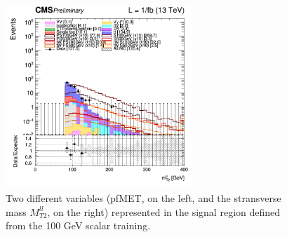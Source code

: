 \documentclass[a4paper, 10pt, openright]{report}
\begin{document}
\begin{figure}[htbp]
{\begin{minipage}[b]{.48\textwidth}
\end{minipage}\hfill
\begin{minipage}[b]{.48\textwidth}
\includegraphics[width=7cm, height=7cm]{figs/2017/log_cratio_topCR_ll_DNN_signal0_scalar100_mt2ll.png}
\end{minipage} \hfill
}
\caption{Two different variables (pf\ac{MET}, on the left, and the stransverse mass $M_{T2}^{ll}$, on the right) represented in the signal region defined from the 100 GeV scalar training.}
\label{fig:SR1}
\end{figure}
\end{document}
